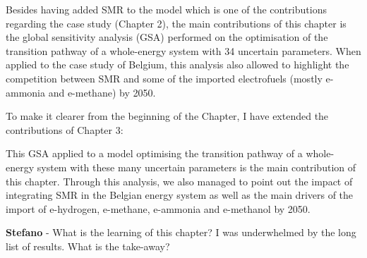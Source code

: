 \documentclass[12pt,a4paper]{article}
\begin{document}
\noindent Besides having added SMR to the model which is one of the contributions regarding the case study (Chapter 2), the main contributions of this chapter is the global sensitivity analysis (GSA) performed on the optimisation of the transition pathway of a whole-energy system with 34 uncertain parameters. When applied to the case study of Belgium, this analysis also allowed to highlight the competition between SMR and some of the imported electrofuels (mostly e-ammonia and e-methane) by 2050. 

To make it clearer from the beginning of the Chapter, I have extended {\color{blue}the contributions of Chapter 3}:

\begin{mdframed}[style=manuscript] %
This GSA applied to a model optimising the transition pathway of a whole-energy system with these many uncertain parameters is the main contribution of this chapter. Through this analysis, we also managed to point out the impact of integrating SMR in the Belgian energy system as well as the main drivers of the import of e-hydrogen, e-methane, e-ammonia and e-methanol by 2050.
\end{mdframed}

\begin{mdframed}[style=comment] %
{\color{orange} \textbf{Stefano}} - What is the learning of this chapter? I was underwhelmed by the long list of results. What is the take-away?
\end{mdframed}
\end{document}
